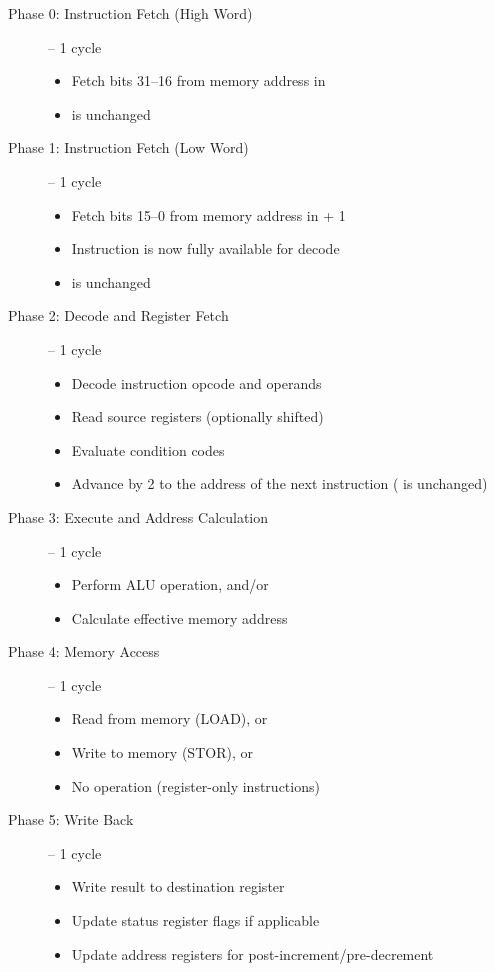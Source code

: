 \begin{description}
	\item[Phase 0: Instruction Fetch (High Word)] -- 1 cycle
	      \begin{itemize}
		      \item Fetch bits 31--16 from memory address in 
		      \item {} is unchanged
	      \end{itemize}

	\item[Phase 1: Instruction Fetch (Low Word)] -- 1 cycle
	      \begin{itemize}
		      \item Fetch bits 15--0 from memory address in  + 1
		      \item Instruction is now fully available for decode
		      \item {} is unchanged
	      \end{itemize}

	\item[Phase 2: Decode and Register Fetch] -- 1 cycle
	      \begin{itemize}
		      \item Decode instruction opcode and operands
		      \item Read source registers (optionally shifted)
		      \item Evaluate condition codes
		      \item Advance  by 2 to the address of the next instruction ( is unchanged)
	      \end{itemize}

	\item[Phase 3: Execute and Address Calculation] -- 1 cycle
	      \begin{itemize}
		      \item Perform ALU operation, and/or
		      \item Calculate effective memory address
	      \end{itemize}

	\item[Phase 4: Memory Access] -- 1 cycle
	      \begin{itemize}
		      \item Read from memory (LOAD), or
		      \item Write to memory (STOR), or
		      \item No operation (register-only instructions)
	      \end{itemize}

	\item[Phase 5: Write Back] -- 1 cycle
	      \begin{itemize}
		      \item Write result to destination register
		      \item Update status register flags if applicable
		      \item Update address registers for post-increment/pre-decrement
	      \end{itemize}
\end{description}

